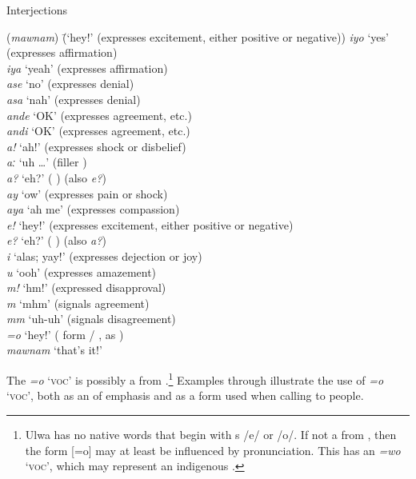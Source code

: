 \ea%
    \label{ex:otherwc:149}
          Interjections
    \begin{tabbing}
{(\textit{mawnam})} \= {(‘hey!’ (expresses excitement, either positive or negative))}\kill
    \textit{iyo}   \>   ‘yes’ (expresses affirmation)\\
    \textit{iya}  \>    ‘yeah’ (expresses affirmation)\\
    \textit{ase}  \>    ‘no’ (expresses denial)\\
    \textit{asa}  \>    ‘nah’ (expresses denial)\\
    \textit{ande}  \>  ‘OK’ (expresses agreement, etc.)\\
    \textit{andi}  \>  ‘OK’ (expresses agreement, etc.)\\
    \textit{a!}   \>   ‘ah!’ (expresses shock or disbelief)\footnotemark{}\\
    \textit{aː}    \>  ‘uh …’ (filler )\\
    \textit{a?}  \>    ‘eh?’ ( ) (also \textit{e?})\\
    \textit{ay}   \>   ‘ow’ (expresses pain or shock)\\
    \textit{aya}  \>    ‘ah me’ (expresses compassion)\\
    \textit{e!}   \>   ‘hey!’ (expresses excitement, either positive or negative)\\
    \textit{e?}  \>    ‘eh?’ ( ) (also \textit{a?})\\
    \textit{i}   \>   ‘alas; yay!’ (expresses dejection or joy)\\
    \textit{u}    \>  ‘ooh’ (expresses amazement)\\
    \textit{m!}   \>   ‘hm!’ (expressed disapproval)\\
    \textit{m}   \>   ‘mhm’ (signals agreement)\\
    \textit{mm}   \>   ‘uh-uh’ (signals disagreement)\\
    \textit{=o}  \>    ‘hey!’ ( form / , as )\\
    \textit{mawnam} \> ‘that’s it!’
\end{tabbing}
\z
{}

  The  \textit{=o} ‘\textsc{voc}’ is possibly a  from .\footnote{Ulwa has no native words that begin with s /e/ or /o/. If not a  from , then the form [=o] may at least be influenced by  pronunciation. This   has an  \textit{=wo} ‘\textsc{voc}’, which may represent an indigenous .} Examples  through  illustrate the use of \textit{=o} ‘\textsc{voc’}, both as an  of emphasis and as a  form used when calling to people.

